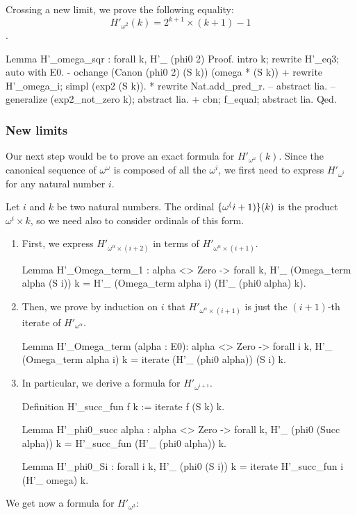 Crossing a new limit, we prove the following equality: 
$$H'_{\omega^2} (k) = 2 ^ {k+1} \times (k+1) - 1$$.

\begin{Coqsrc}
Lemma H'_omega_sqr : forall k,
    H'_ (phi0  2)%
Proof.
  intro k; rewrite H'_eq3; auto with E0.
  - ochange (Canon (phi0 2) (S k)) (omega * (S k))%
    +  rewrite H'_omega_i; simpl (exp2 (S k)).
       *  rewrite Nat.add_pred_r.
          -- abstract lia. 
          -- generalize (exp2_not_zero k); abstract lia.
    + cbn; f_equal; abstract lia.
Qed.
\end{Coqsrc}

\subsubsection{New limits}

Our next step would be to prove an exact formula for $H'_{\omega^\omega}(k)$.
Since the canonical sequence of $\omega^\omega$ is composed of all the
$\omega^i$, we first need to express $H'_{\omega^i}$ for any natural number $i$.

Let $i$ and $k$ be two natural numbers. 
The ordinal $\mbox{$\{\omega^(i+1)\}(k)$}$ is the product
$\omega^i \times k$, so we need also to consider ordinals of this form.

\begin{enumerate}
\item First,  we express $H'_{\omega^\alpha \times (i+2)}$ in terms of
$H'_{\omega^\alpha \times (i+1)}$.

\begin{Coqsrc}
Lemma H'_Omega_term_1 : alpha <> Zero -> forall k,  
    H'_ (Omega_term alpha (S i)) k =
    H'_ (Omega_term alpha i) (H'_ (phi0 alpha) k).
\end{Coqsrc}

\item
Then, we prove by induction on $i$ that $H'_{\omega^\alpha \times (i+1)}$ is just the
$(i+1)$-th iterate of $H'_{\omega^\alpha}$.


\begin{Coqsrc}
Lemma H'_Omega_term (alpha : E0):
alpha <> Zero -> forall i k, 
  H'_ (Omega_term alpha i) k = iterate (H'_ (phi0 alpha)) (S i) k.
\end{Coqsrc}

\item In particular, we derive a formula for $H'_{\omega^{i+1}}$.

\begin{Coqsrc}
Definition H'_succ_fun f k := iterate f (S k) k.

Lemma H'_phi0_succ alpha  : alpha <> Zero -> forall k,
 H'_ (phi0 (Succ alpha)) k = H'_succ_fun (H'_ (phi0 alpha)) k. 

Lemma H'_phi0_Si : forall i k,
 H'_ (phi0 (S i)) k = iterate H'_succ_fun i (H'_ omega) k. 
\end{Coqsrc}

\end{enumerate}
We get now a  formula for $H'_{\omega^3}$:


